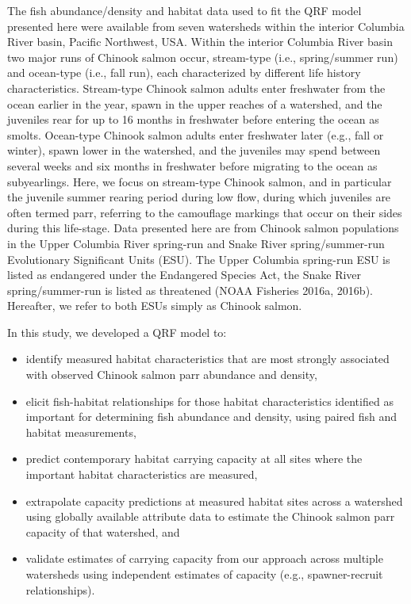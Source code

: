 \documentclass[
  12pt,
]{article}
\providecommand{\tightlist}{%
  \setlength{\itemsep}{0pt}\setlength{\parskip}{0pt}}
\begin{document}
The fish abundance/density and habitat data used to fit the QRF model presented here were available from seven watersheds within the interior Columbia River basin, Pacific Northwest, USA. Within the interior Columbia River basin two major runs of Chinook salmon occur, stream-type (i.e., spring/summer run) and ocean-type (i.e., fall run), each characterized by different life history characteristics. Stream-type Chinook salmon adults enter freshwater from the ocean earlier in the year, spawn in the upper reaches of a watershed, and the juveniles rear for up to 16 months in freshwater before entering the ocean as smolts. Ocean-type Chinook salmon adults enter freshwater later (e.g., fall or winter), spawn lower in the watershed, and the juveniles may spend between several weeks and six months in freshwater before migrating to the ocean as subyearlings. Here, we focus on stream-type Chinook salmon, and in particular the juvenile summer rearing period during low flow, during which juveniles are often termed parr, referring to the camouflage markings that occur on their sides during this life-stage. Data presented here are from Chinook salmon populations in the Upper Columbia River spring-run and Snake River spring/summer-run Evolutionary Significant Units (ESU). The Upper Columbia spring-run ESU is listed as endangered under the Endangered Species Act, the Snake River spring/summer-run is listed as threatened (NOAA Fisheries 2016a, 2016b). Hereafter, we refer to both ESUs simply as Chinook salmon.

In this study, we developed a QRF model to:

\begin{itemize}
\tightlist
\item
  identify measured habitat characteristics that are most strongly associated with observed Chinook salmon parr abundance and density,
\item
  elicit fish-habitat relationships for those habitat characteristics identified as important for determining fish abundance and density, using paired fish and habitat measurements,
\item
  predict contemporary habitat carrying capacity at all sites where the important habitat characteristics are measured,
\item
  extrapolate capacity predictions at measured habitat sites across a watershed using globally available attribute data to estimate the Chinook salmon parr capacity of that watershed, and
\item
  validate estimates of carrying capacity from our approach across multiple watersheds using independent estimates of capacity (e.g., spawner-recruit relationships).
\end{itemize}
\end{document}
